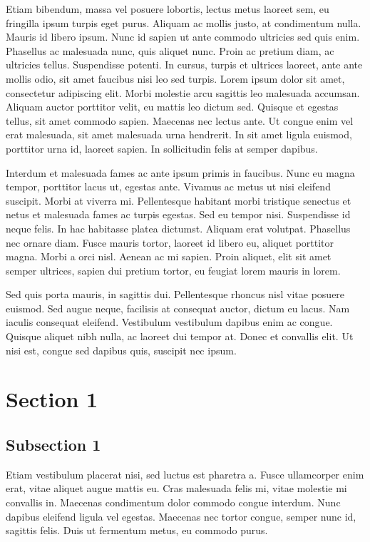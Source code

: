 \documentclass[11pt]{article}
\begin{document}
 Etiam bibendum, massa vel posuere lobortis, lectus metus laoreet sem, eu fringilla ipsum turpis eget purus. Aliquam ac mollis justo, at condimentum nulla. Mauris id libero ipsum. Nunc id sapien ut ante commodo ultricies sed quis enim. Phasellus ac malesuada nunc, quis aliquet nunc. Proin ac pretium diam, ac ultricies tellus. Suspendisse potenti. In cursus, turpis et ultrices laoreet, ante ante mollis odio, sit amet faucibus nisi leo sed turpis. Lorem ipsum dolor sit amet, consectetur adipiscing elit. Morbi molestie arcu sagittis leo malesuada accumsan. Aliquam auctor porttitor velit, eu mattis leo dictum sed. Quisque et egestas tellus, sit amet commodo sapien. Maecenas nec lectus ante. Ut congue enim vel erat malesuada, sit amet malesuada urna hendrerit. In sit amet ligula euismod, porttitor urna id, laoreet sapien. In sollicitudin felis at semper dapibus. 

 Interdum et malesuada fames ac ante ipsum primis in faucibus. Nunc eu magna tempor, porttitor lacus ut, egestas ante. Vivamus ac metus ut nisi eleifend suscipit. Morbi at viverra mi. Pellentesque habitant morbi tristique senectus et netus et malesuada fames ac turpis egestas. Sed eu tempor nisi. Suspendisse id neque felis. In hac habitasse platea dictumst. Aliquam erat volutpat. Phasellus nec ornare diam. Fusce mauris tortor, laoreet id libero eu, aliquet porttitor magna. Morbi a orci nisl. Aenean ac mi sapien. Proin aliquet, elit sit amet semper ultrices, sapien dui pretium tortor, eu feugiat lorem mauris in lorem. 

 Sed quis porta mauris, in sagittis dui. Pellentesque rhoncus nisl vitae posuere euismod. Sed augue neque, facilisis at consequat auctor, dictum eu lacus. Nam iaculis consequat eleifend. Vestibulum vestibulum dapibus enim ac congue. Quisque aliquet nibh nulla, ac laoreet dui tempor at. Donec et convallis elit. Ut nisi est, congue sed dapibus quis, suscipit nec ipsum.
 
\section{Section 1}
\subsection{Subsection 1}
Etiam vestibulum placerat nisi, sed luctus est pharetra a. Fusce ullamcorper enim erat, vitae aliquet augue mattis eu. Cras malesuada felis mi, vitae molestie mi convallis in. Maecenas condimentum dolor commodo congue interdum. Nunc dapibus eleifend ligula vel egestas. Maecenas nec tortor congue, semper nunc id, sagittis felis. Duis ut fermentum metus, eu commodo purus. 
\end{document}
